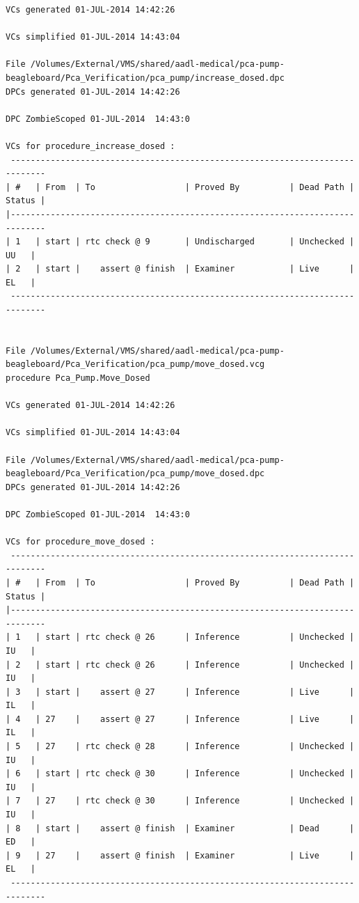 \begin{lstlisting}[frame=single, gobble=0, caption={POGS report}, label={listing:pcapump_dosemonitor_pogs}]
VCs generated 01-JUL-2014 14:42:26

VCs simplified 01-JUL-2014 14:43:04

File /Volumes/External/VMS/shared/aadl-medical/pca-pump-beagleboard/Pca_Verification/pca_pump/increase_dosed.dpc
DPCs generated 01-JUL-2014 14:42:26

DPC ZombieScoped 01-JUL-2014  14:43:0

VCs for procedure_increase_dosed :
 -----------------------------------------------------------------------------
| #   | From  | To                  | Proved By          | Dead Path | Status |
|-----------------------------------------------------------------------------
| 1   | start | rtc check @ 9       | Undischarged       | Unchecked |   UU   |
| 2   | start |    assert @ finish  | Examiner           | Live      |   EL   |
 -----------------------------------------------------------------------------


File /Volumes/External/VMS/shared/aadl-medical/pca-pump-beagleboard/Pca_Verification/pca_pump/move_dosed.vcg
procedure Pca_Pump.Move_Dosed

VCs generated 01-JUL-2014 14:42:26

VCs simplified 01-JUL-2014 14:43:04

File /Volumes/External/VMS/shared/aadl-medical/pca-pump-beagleboard/Pca_Verification/pca_pump/move_dosed.dpc
DPCs generated 01-JUL-2014 14:42:26

DPC ZombieScoped 01-JUL-2014  14:43:0

VCs for procedure_move_dosed :
 -----------------------------------------------------------------------------
| #   | From  | To                  | Proved By          | Dead Path | Status |
|-----------------------------------------------------------------------------
| 1   | start | rtc check @ 26      | Inference          | Unchecked |   IU   |
| 2   | start | rtc check @ 26      | Inference          | Unchecked |   IU   |
| 3   | start |    assert @ 27      | Inference          | Live      |   IL   |
| 4   | 27    |    assert @ 27      | Inference          | Live      |   IL   |
| 5   | 27    | rtc check @ 28      | Inference          | Unchecked |   IU   |
| 6   | start | rtc check @ 30      | Inference          | Unchecked |   IU   |
| 7   | 27    | rtc check @ 30      | Inference          | Unchecked |   IU   |
| 8   | start |    assert @ finish  | Examiner           | Dead      |   ED   |
| 9   | 27    |    assert @ finish  | Examiner           | Live      |   EL   |
 -----------------------------------------------------------------------------



\end{lstlisting}

